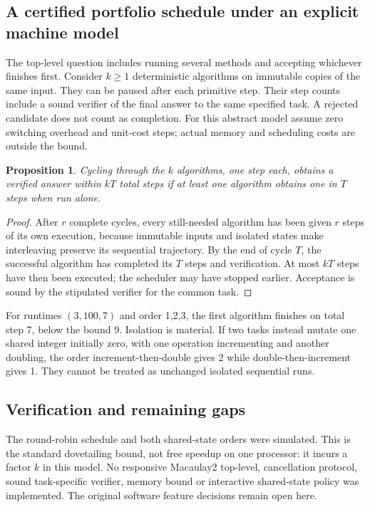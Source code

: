 \documentclass[11pt]{article}
\newtheorem{proposition}{Proposition}
\begin{document}
\subsection{A certified portfolio schedule under an explicit machine model}
The top-level question includes running several methods and accepting whichever finishes first. Consider $k\ge1$ deterministic algorithms on immutable copies of the same input. They can be paused after each primitive step. Their step counts include a sound verifier of the final answer to the same specified task. A rejected candidate does not count as completion. For this abstract model assume zero switching overhead and unit-cost steps; actual memory and scheduling costs are outside the bound.
\begin{proposition}
Cycling through the $k$ algorithms, one step each, obtains a verified answer within $kT$ total steps if at least one algorithm obtains one in $T$ steps when run alone.
\end{proposition}
\begin{proof}
After $r$ complete cycles, every still-needed algorithm has been given $r$ steps of its own execution, because immutable inputs and isolated states make interleaving preserve its sequential trajectory. By the end of cycle $T$, the successful algorithm has completed its $T$ steps and verification. At most $kT$ steps have then been executed; the scheduler may have stopped earlier. Acceptance is sound by the stipulated verifier for the common task.
\end{proof}
For runtimes $(3,100,7)$ and order 1,2,3, the first algorithm finishes on total step 7, below the bound 9. Isolation is material. If two tasks instead mutate one shared integer initially zero, with one operation incrementing and another doubling, the order increment-then-double gives 2 while double-then-increment gives 1. They cannot be treated as unchanged isolated sequential runs.
\subsection{Verification and remaining gaps}
The round-robin schedule and both shared-state orders were simulated. This is the standard dovetailing bound, not free speedup on one processor: it incurs a factor $k$ in this model. No responsive Macaulay2 top-level, cancellation protocol, sound task-specific verifier, memory bound or interactive shared-state policy was implemented. The original software feature decisions remain open here.
\end{document}
